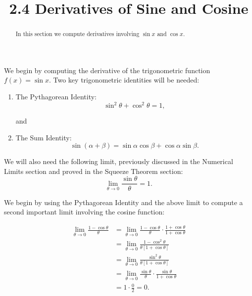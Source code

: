 \documentclass[handout]{ximera}
\title{2.4 Derivatives of Sine and Cosine}
\begin{document}
\begin{abstract}
In this section we compute derivatives involving $\sin x$ and $\cos x$.
\end{abstract}

\maketitle


We begin by computing the derivative of the trigonometric function $f(x) = \sin x$.  
Two key trigonometric identities will be needed:
\begin{enumerate}
\item The Pythagorean Identity:
\[
\sin^2 \theta  + \cos^2 \theta  = 1,
\]
\begin{center}
and
\end{center}
\item The Sum Identity:
\[
\sin(\alpha + \beta) = \sin \alpha \cos \beta  + \cos \alpha \sin \beta .
\]
\end{enumerate}

We will also need the following limit, previously discussed in the Numerical Limits section and proved in the Squeeze Theorem section:
\[
\lim_{\theta \to 0} \frac{\sin \theta }{\theta} = 1.
\]

We begin by using  the Pythagorean Identity and the above limit
to compute a second important limit involving the cosine function:

\begin{align*}
\lim_{\theta \to 0} \frac{1 - \cos \theta }{\theta} &= \lim_{\theta \to 0} \frac{1 - \cos \theta }{\theta} \cdot \frac{1 + \cos \theta }{1 + \cos \theta }\\
&= \lim_{\theta \to 0} \frac{1 - \cos^2 \theta }{\theta[1 + \cos \theta ]}\\
&= \lim_{\theta \to 0} \frac{\sin^2 \theta }{\theta[1 + \cos \theta ]}\\
&= \lim_{\theta \to 0} \frac{\sin \theta }{\theta} \cdot \frac{\sin \theta }{1 + \cos \theta }\\
&= 1 \cdot \frac{0}{2} = 0.
\end{align*}
\end{document}

